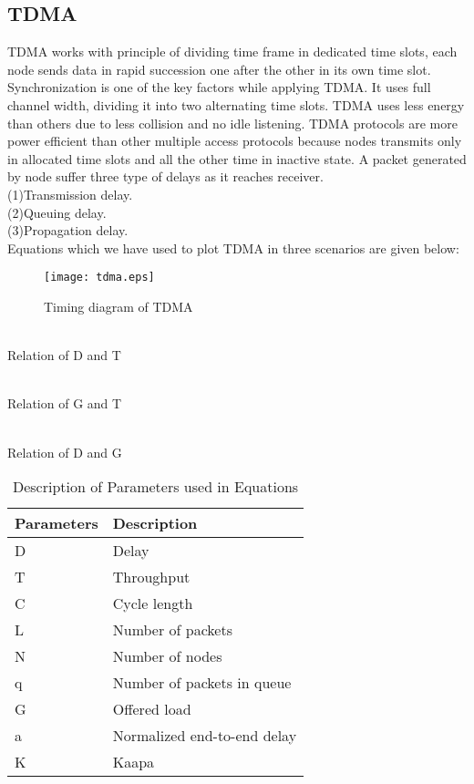 \documentclass[10pt, conference, compsocconf]{IEEEtran}
\begin{document}
\subsection{TDMA}
TDMA works with principle of dividing time frame in dedicated time slots, each node sends data in rapid
succession one after the other in its own time slot. Synchronization is one of the key factors while applying TDMA. It uses full channel width, dividing it
into two alternating time slots. TDMA uses less energy than others due to less collision and no idle listening. TDMA protocols are more power efficient than other multiple access protocols because nodes transmits only in allocated time slots and all the other time in inactive state. A packet generated by node suffer three type of delays as it reaches receiver.
\\
{(1)}Transmission delay.
\\
{(2)}Queuing delay.
\\
{(3)}Propagation delay.
\\Equations which we have used to plot TDMA in three scenarios are given below:
\begin{figure}[!h]
\centering
\caption{Timing diagram of TDMA}
\texttt{[image: tdma.eps]}
\end{figure}
\\
Relation of D and T

\\
Relation of G and T

\\
Relation of D and G

\begin{table}
\caption{Description of Parameters used in Equations}
\begin{center}
    \begin{tabular}{ | p{2.5cm} | p{2.5cm} |}
    \hline
    Parameters & Description\\ \hline
    D & Delay\\ \hline
    T & Throughput\\ \hline
    C & Cycle length\\ \hline
    L & Number of packets\\ \hline
    N & Number of nodes\\ \hline
    q & Number of packets in queue\\ \hline
    G & Offered load\\ \hline
    a & Normalized end-to-end delay\\ \hline
    K & Kaapa\\ \hline
    \end{tabular}
\end{center}
\end{table}
\end{document}
